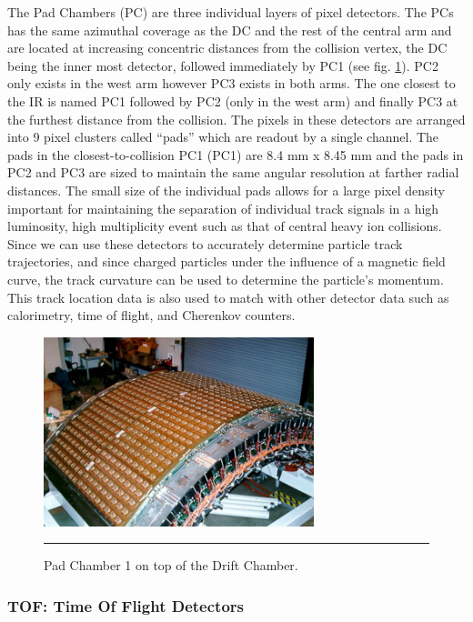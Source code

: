 The Pad Chambers\citep{PCfocus} (PC) are three individual layers of pixel detectors. The PCs has the same azimuthal coverage as the DC and the rest of the central arm and are located at increasing concentric distances from the collision vertex, the DC being the inner most detector, followed immediately by PC1 (see fig. \ref{fig:pcdiagram}). PC2 only exists in the west arm however PC3 exists in both arms. The one closest to the IR is named PC1 followed by PC2 (only in the west arm) and finally PC3 at the furthest distance from the collision. The pixels in these detectors are arranged into 9 pixel clusters called ``pads'' which are readout by a single channel. The pads in the closest-to-collision PC1 (PC1) are 8.4 mm x 8.45 mm and the pads in PC2 and PC3 are sized to maintain the same angular resolution at farther radial distances. The small size of the individual pads allows for a large pixel density important for maintaining the separation of individual track signals in a high luminosity, high multiplicity event such as that of central heavy ion collisions. Since we can use these detectors to accurately determine particle track trajectories, and since charged particles under the influence of a magnetic field curve, the track curvature can be used to determine the particle's momentum. This track location data is also used to match with other detector data such as calorimetry, time of flight, and Cherenkov counters.
\begin{figure}[htbp]
  \centering
    \includegraphics[width=0.7\textwidth]{Figures/PC1.jpg}
    \rule{35em}{0.5pt}
  \caption[Pad Chamber 1 on top of the Drift Chamber.]{Pad Chamber 1 on top of the Drift Chamber.}
  \label{fig:pcdiagram}
\end{figure}

\subsubsection{TOF: Time Of Flight Detectors}

